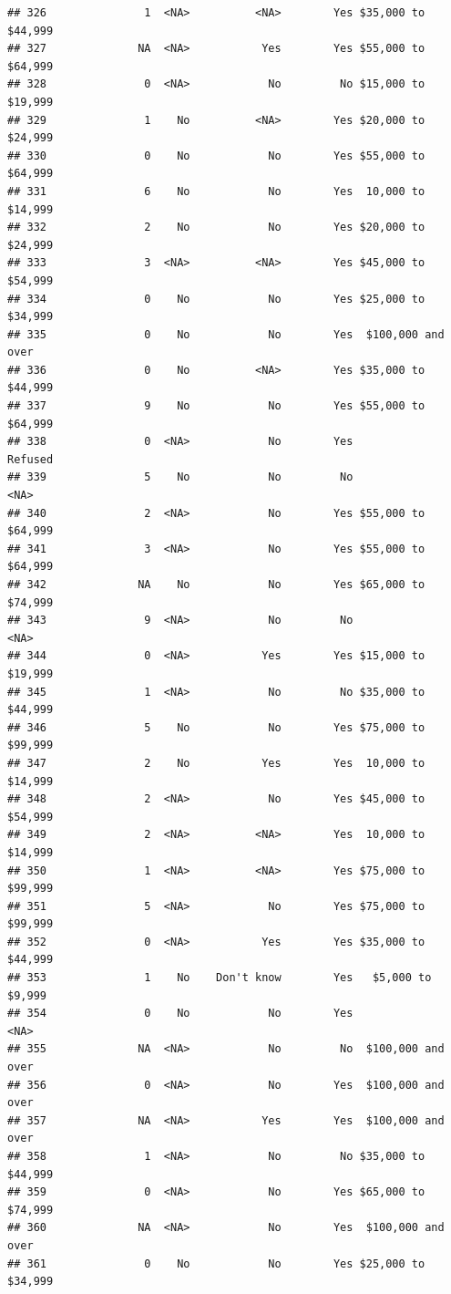 \documentclass[man]{apa6}
\begin{document}
\begin{verbatim}
## 326               1  <NA>          <NA>        Yes $35,000 to $44,999
## 327              NA  <NA>           Yes        Yes $55,000 to $64,999
## 328               0  <NA>            No         No $15,000 to $19,999
## 329               1    No          <NA>        Yes $20,000 to $24,999
## 330               0    No            No        Yes $55,000 to $64,999
## 331               6    No            No        Yes  10,000 to $14,999
## 332               2    No            No        Yes $20,000 to $24,999
## 333               3  <NA>          <NA>        Yes $45,000 to $54,999
## 334               0    No            No        Yes $25,000 to $34,999
## 335               0    No            No        Yes  $100,000 and over
## 336               0    No          <NA>        Yes $35,000 to $44,999
## 337               9    No            No        Yes $55,000 to $64,999
## 338               0  <NA>            No        Yes            Refused
## 339               5    No            No         No               <NA>
## 340               2  <NA>            No        Yes $55,000 to $64,999
## 341               3  <NA>            No        Yes $55,000 to $64,999
## 342              NA    No            No        Yes $65,000 to $74,999
## 343               9  <NA>            No         No               <NA>
## 344               0  <NA>           Yes        Yes $15,000 to $19,999
## 345               1  <NA>            No         No $35,000 to $44,999
## 346               5    No            No        Yes $75,000 to $99,999
## 347               2    No           Yes        Yes  10,000 to $14,999
## 348               2  <NA>            No        Yes $45,000 to $54,999
## 349               2  <NA>          <NA>        Yes  10,000 to $14,999
## 350               1  <NA>          <NA>        Yes $75,000 to $99,999
## 351               5  <NA>            No        Yes $75,000 to $99,999
## 352               0  <NA>           Yes        Yes $35,000 to $44,999
## 353               1    No    Don't know        Yes   $5,000 to $9,999
## 354               0    No            No        Yes               <NA>
## 355              NA  <NA>            No         No  $100,000 and over
## 356               0  <NA>            No        Yes  $100,000 and over
## 357              NA  <NA>           Yes        Yes  $100,000 and over
## 358               1  <NA>            No         No $35,000 to $44,999
## 359               0  <NA>            No        Yes $65,000 to $74,999
## 360              NA  <NA>            No        Yes  $100,000 and over
## 361               0    No            No        Yes $25,000 to $34,999

\end{verbatim}
\end{document}
